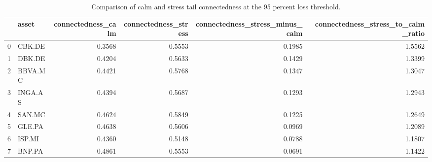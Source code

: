 \begin{table}
\caption{Comparison of calm and stress tail connectedness at the 95 percent loss threshold.}
\label{tab:tail_connectedness_calm_stress_comparison_q95}
\begin{tabular}{llrrrr}
\toprule
 & asset & connectedness_calm & connectedness_stress & connectedness_stress_minus_calm & connectedness_stress_to_calm_ratio \\
\midrule
0 & CBK.DE & 0.3568 & 0.5553 & 0.1985 & 1.5562 \\
1 & DBK.DE & 0.4204 & 0.5633 & 0.1429 & 1.3399 \\
2 & BBVA.MC & 0.4421 & 0.5768 & 0.1347 & 1.3047 \\
3 & INGA.AS & 0.4394 & 0.5687 & 0.1293 & 1.2943 \\
4 & SAN.MC & 0.4624 & 0.5849 & 0.1225 & 1.2649 \\
5 & GLE.PA & 0.4638 & 0.5606 & 0.0969 & 1.2089 \\
6 & ISP.MI & 0.4360 & 0.5148 & 0.0788 & 1.1807 \\
7 & BNP.PA & 0.4861 & 0.5553 & 0.0691 & 1.1422 \\
\bottomrule
\end{tabular}
\end{table}
